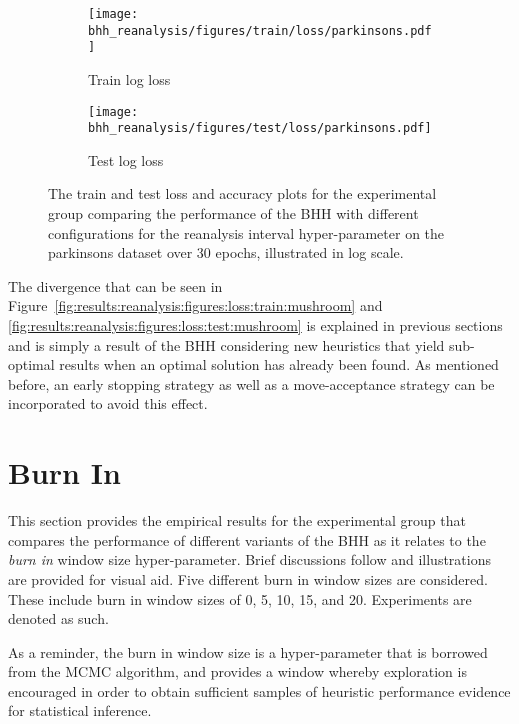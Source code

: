 \begin{figure}[htbp]
      \begin{subfigure}{0.5\textwidth}
            \centering
            \texttt{[image: bhh\_reanalysis/figures/train/loss/parkinsons.pdf]}
            \caption{Train log loss}
            \label{fig:results:reanalysis:figures:loss:train:parkinsons}
      \end{subfigure}
      \begin{subfigure}{0.5\textwidth}
            \centering
            \texttt{[image: bhh\_reanalysis/figures/test/loss/parkinsons.pdf]}
            \caption{Test log loss}
            \label{fig:results:reanalysis:figures:loss:test:parkinsons}
      \end{subfigure}
      \par\bigskip
      \caption{The train and test loss and accuracy plots for the experimental group comparing the performance of the \acs{BHH} with different configurations for the reanalysis interval hyper-parameter on the parkinsons dataset over 30 epochs, illustrated in log scale.}
      \label{fig:results:reanalysis:figures:parkinsons}
\end{figure}

The divergence that can be seen in Figure~\ref{fig:results:reanalysis:figures:loss:train:mushroom} and \ref{fig:results:reanalysis:figures:loss:test:mushroom} is explained in previous sections and is simply a result of the \acs{BHH} considering new heuristics that yield sub-optimal results when an optimal solution has already been found. As mentioned before, an early stopping strategy as well as a move-acceptance strategy can be incorporated to avoid this effect.

\section{Burn In}\label{sec:results:burn_in}

This section provides the empirical results for the experimental group that compares the performance of different variants of the \acs{BHH} as it relates to the \textit{burn in} window size hyper-parameter. Brief discussions follow and illustrations are provided for visual aid. Five different burn in window sizes are considered. These include burn in window sizes of 0, 5, 10, 15, and 20. Experiments are denoted as such.

As a reminder, the burn in window size is a hyper-parameter that is borrowed from the \acs{MCMC} algorithm, and provides a window whereby exploration is encouraged in order to obtain sufficient samples of heuristic performance evidence for statistical inference.


